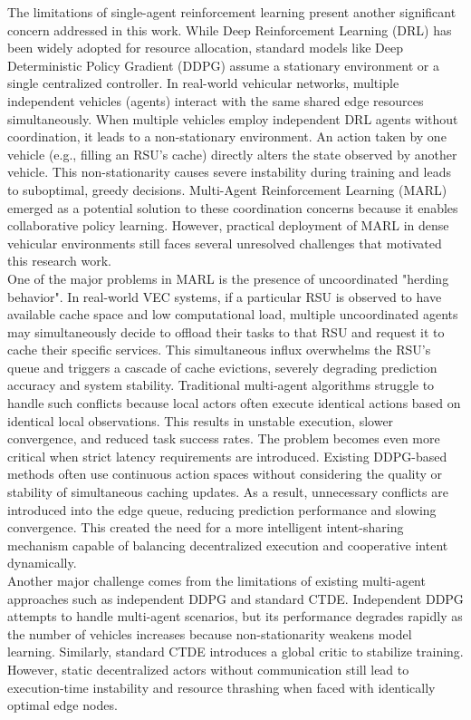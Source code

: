 \documentclass[12pt,a4paper]{report}
\begin{document}
The limitations of single-agent reinforcement learning present another significant concern addressed in this work. While Deep Reinforcement Learning (DRL) has been widely adopted for resource allocation, standard models like Deep Deterministic Policy Gradient (DDPG) assume a stationary environment or a single centralized controller. In real-world vehicular networks, multiple independent vehicles (agents) interact with the same shared edge resources simultaneously. When multiple vehicles employ independent DRL agents without coordination, it leads to a non-stationary environment. An action taken by one vehicle (e.g., filling an RSU's cache) directly alters the state observed by another vehicle. This non-stationarity causes severe instability during training and leads to suboptimal, greedy decisions. Multi-Agent Reinforcement Learning (MARL) emerged as a potential solution to these coordination concerns because it enables collaborative policy learning. However, practical deployment of MARL in dense vehicular environments still faces several unresolved challenges that motivated this research work.\\

One of the major problems in MARL is the presence of uncoordinated "herding behavior". In real-world VEC systems, if a particular RSU is observed to have available cache space and low computational load, multiple uncoordinated agents may simultaneously decide to offload their tasks to that RSU and request it to cache their specific services. This simultaneous influx overwhelms the RSU's queue and triggers a cascade of cache evictions, severely degrading prediction accuracy and system stability. Traditional multi-agent algorithms struggle to handle such conflicts because local actors often execute identical actions based on identical local observations. This results in unstable execution, slower convergence, and reduced task success rates. The problem becomes even more critical when strict latency requirements are introduced. Existing DDPG-based methods often use continuous action spaces without considering the quality or stability of simultaneous caching updates. As a result, unnecessary conflicts are introduced into the edge queue, reducing prediction performance and slowing convergence. This created the need for a more intelligent intent-sharing mechanism capable of balancing decentralized execution and cooperative intent dynamically.\\

Another major challenge comes from the limitations of existing multi-agent approaches such as independent DDPG and standard CTDE. Independent DDPG attempts to handle multi-agent scenarios, but its performance degrades rapidly as the number of vehicles increases because non-stationarity weakens model learning. Similarly, standard CTDE introduces a global critic to stabilize training. However, static decentralized actors without communication still lead to execution-time instability and resource thrashing when faced with identically optimal edge nodes.\\
\end{document}
